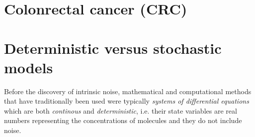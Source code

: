 \documentclass[12pt,a4paper]{report}
\begin{document}








\section{Colonrectal cancer (CRC)}

\section{Deterministic versus stochastic models}
Before the discovery of intrinsic noise, mathematical and computational methods that have traditionally been used were typically \emph{systems of differential equations} which are both \emph{continous} and \emph{deterministic}, i.e. their state variables are real numbers representing the concentrations of molecules and they do not include noise.
\end{document}
